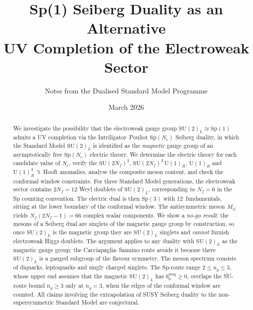 \documentclass[11pt,a4paper]{article}
\theoremstyle{plain}
\theoremstyle{definition}
\theoremstyle{remark}
\newcommand{\Nc}{N_{\!c}}
\newcommand{\Nf}{N_{\!f}}
\newcommand{\SU}[1]{\mathrm{SU}(#1)}
\newcommand{\UU}[1]{\mathrm{U}(#1)}
\newcommand{\Sp}[1]{\mathrm{Sp}(#1)}
\begin{document}
\title{\textbf{Sp(1) Seiberg Duality as an Alternative\\
UV Completion of the Electroweak Sector}}
\author{Notes from the Dualised Standard Model Programme}
\date{March 2026}
\maketitle

\begin{abstract}
We investigate the possibility that the electroweak gauge group
$\SU{2}_L \cong \Sp{1}$ admits a UV completion via the
Intriligator--Pouliot $\Sp{\Nc}$ Seiberg duality, in which the
Standard Model $\SU{2}_L$ is identified as the \emph{magnetic} gauge
group of an asymptotically free $\Sp{\Nc}$ electric theory.
We determine the electric theory for each candidate value of $\Nc$,
verify the $\SU{2\Nf}^3$, $\SU{2\Nf}^2\,\UU{1}_R$, $\UU{1}_R$ and
$\UU{1}_R^3$ 't~Hooft anomalies, analyse the composite meson content,
and check the conformal window constraints.  For three Standard Model
generations, the electroweak sector contains $2\Nf = 12$ Weyl doublets
of $\SU{2}_L$, corresponding to $\Nf = 6$ in the Sp counting
convention.  The electric dual is then $\Sp{3}$ with 12~fundamentals,
sitting at the lower boundary of the conformal window.  The
antisymmetric meson $M_{ij}$ yields $\Nf(2\Nf-1) = 66$ complex scalar
components.  We show a \emph{no-go result}: the mesons of a Seiberg dual
are singlets of the magnetic gauge group by construction, so once
$\SU{2}_L$ is the magnetic group they are $\SU{2}_L$ singlets and
\emph{cannot} furnish electroweak Higgs doublets.  The argument applies
to any duality with $\SU{2}_L$ as the magnetic gauge group; the
Cacciapaglia--Sannino route avoids it because there $\SU{2}_L$ is a
gauged subgroup of the flavour symmetry.  The meson spectrum consists
of diquarks, leptoquarks and singly charged singlets.  The Sp-route
range $2 \leq n_g \leq 3$, whose upper end assumes that the magnetic
$\SU{2}_L$ has $b_0^{\mathrm{mag}} \geq 0$, overlaps the SU-route bound
$n_g \geq 3$ only at $n_g = 3$, when the edges of the conformal window
are counted.  All claims involving the extrapolation of SUSY Seiberg
duality to the non-supersymmetric Standard Model are conjectural.
\end{abstract}

\tableofcontents
\newpage

\end{document}
